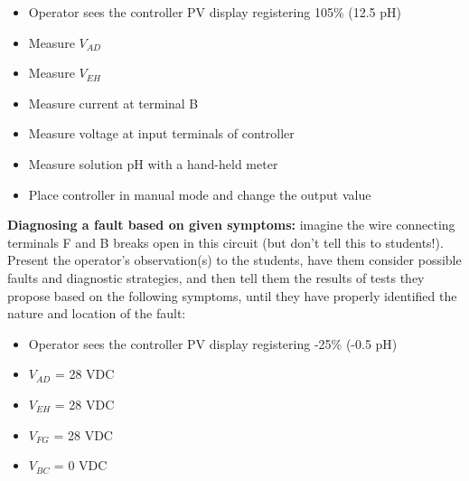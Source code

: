 \begin{itemize}
\item{} Operator sees the controller PV display registering 105\% (12.5 pH)
\item{} Measure $V_{AD}$
\item{} Measure $V_{EH}$
\item{} Measure current at terminal B
\item{} Measure voltage at input terminals of controller
\item{} Measure solution pH with a hand-held meter
\item{} Place controller in manual mode and change the output value
\end{itemize}


\vskip 10pt


\noindent
{\bf Diagnosing a fault based on given symptoms:} imagine the wire connecting terminals F and B breaks open in this circuit (but don't tell this to students!).  Present the operator's observation(s) to the students, have them consider possible faults and diagnostic strategies, and then tell them the results of tests they propose based on the following symptoms, until they have properly identified the nature and location of the fault:

\begin{itemize}
\item{} Operator sees the controller PV display registering -25\% (-0.5 pH)
\item{} $V_{AD}$ = 28 VDC
\item{} $V_{EH}$ = 28 VDC
\item{} $V_{FG}$ = 28 VDC
\item{} $V_{BC}$ = 0 VDC
\end{itemize}




